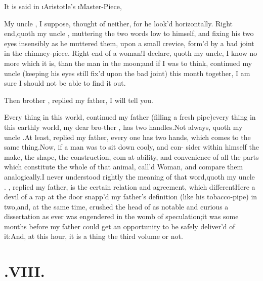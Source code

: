 \documentclass[twoside]{article}
\begin{document}
It is said in \i{Aristotle}’s \i{Master-Piece},\break
{}

My uncle \toby, I suppose, thought of neither, for he
look’d horizontally.\tsk\break
Right end,\tsk quoth my uncle \toby, muttering the two words low to himself, and fixing his
two eyes insensibly as he muttered them, upon a small crevice,
form’d by a bad joint in the chimney-piece.\tsk\break
Right end of a woman!\tsh I declare,
quoth my uncle, I know no more which it is, than the man in the
moon;\tsk and if I was to think, continued my uncle
\toby (keeping his eyes still fix’d upon the bad joint)
this month together, I am sure I should not be able to find it
out.

Then brother \toby, replied my father, I will tell you.

Every thing in this world, continued my father (filling a fresh
pipe)\tsk every thing in this earthly world, my dear
bro-\break ther \toby,
has two handles.\tsk Not always, quoth my uncle
\toby.\tsh At least, replied my father, every one
has two hands,\tsk\break
which comes to the same
thing.\tsh Now, if a man was to sit down cooly, and con-\break
sider within himself the make, the shape, the construction,
com-at-ability, and convenience of all the parts which
constitute
the whole of that animal, call’d Woman, and compare them
analogically.\tsk I never understood rightly the meaning of that
word,\tsk quoth my uncle \toby.\tsh\break
{}, replied my father, is the certain
relation and agreement, which different\tsh Here a devil of
a rap at the door snapp’d my father’s definition (like his
tobacco-pipe) in two,\tsk and, at the same time, crushed the head
of as notable and curious a dissertation as ever was
engendered in the womb of speculation;\tsk it was some months
before my father could get an opportunity to be safely
deliver’d of
it:\tsk And, at this hour, it is a thing\break
{}
the third volume or not.

\section{\chapstrut{}.\enspace  VIII.}
\end{document}
